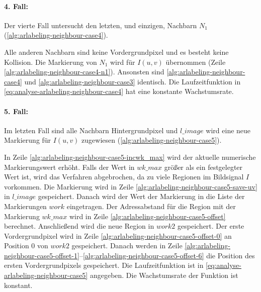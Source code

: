 \paragraph{4. Fall:} %
\label{par:fall_4_}
Der vierte Fall untersucht den letzten, und einzigen, Nachbarn $N_1$ (\autoref{alg:arlabeling-neighbour-case4}).

Alle anderen Nachbarn sind keine Vordergrundpixel und es besteht keine Kollision. Die Markierung von $N_1$ wird für
 $I(u,v)$ übernommen (Zeile \ref{alg:arlabeling-neighbour-case4-n1}). Ansonsten sind
 \autoref{alg:arlabeling-neighbour-case4} und \autoref{alg:arlabeling-neighbour-case3} identisch. Die Laufzeitfunktion
 in \autoref{eq:analyse-arlabeling-neighbour-case4} hat eine konstante Wachstumsrate.


\paragraph{5. Fall:} %
\label{par:fall_5_}
Im letzten Fall sind alle Nachbarn Hintergrundpixel und $\mathit{l\_image}$ wird eine neue Markierung für $I(u,v)$
 zugewiesen (\autoref{alg:arlabeling-neighbour-case5}).

In Zeile \ref{alg:arlabeling-neighbour-case5-incwk_max} wird der aktuelle numerische Markierungswert erhöht. Falls der
 Wert in $\mathit{wk\_max}$ größer als ein festgelegter Wert ist, wird das Verfahren abgebrochen, da zu viele Regionen
 im Bildsignal $I$ vorkommen. Die Markierung wird in Zeile \ref{alg:arlabeling-neighbour-case5-save-uv} in
 $\mathit{l\_image}$ gespeichert. Danach wird der Wert der Markierung in die Liste der Markierungen $\mathit{work}$
 eingetragen. Der Adressabstand für die Region mit der Markierung $\mathit{wk\_max}$ wird in Zeile
 \ref{alg:arlabeling-neighbour-case5-offset} berechnet. Anschließend wird die neue Region in $\mathit{work2}$
 gespeichert. Der erste Vordergrundpixel wird in Zeile \ref{alg:arlabeling-neighbour-case5-offset-0} an Position $0$
 von $\mathit{work2}$ gespeichert. Danach werden in Zeile
 \ref{alg:arlabeling-neighbour-case5-offset-1}--\ref{alg:arlabeling-neighbour-case5-offset-6} die Position des ersten
 Vordergrundpixels gespeichert. Die Laufzeitfunktion ist in \autoref{eq:analyse-arlabeling-neighbour-case5} angegeben.
 Die Wachstumsrate der Funktion ist konstant.


